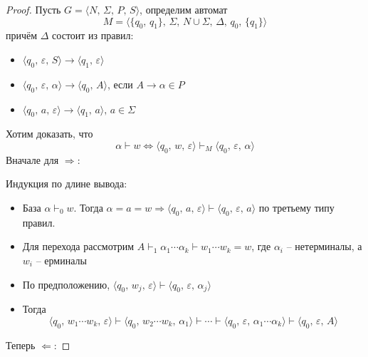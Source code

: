 \documentclass[a4paper,12pt]{article}
\theoremstyle{plain}
\theoremstyle{definition}
\theoremstyle{remark}
\begin{document}
\begin{proof}
	Пусть $G = \langle N,\, \Sigma,\, P,\, S\rangle$, определим автомат
	\[
		M = \langle \{q_0,\, q_1\},\, \Sigma,\, N \cup \Sigma,\, \Delta,\, q_0,\, \{q_1\}\rangle
	\]
	причём $\Delta$ состоит из правил:
	\begin{itemize}
		\item $\langle q_0,\, \varepsilon,\, S\rangle \to \langle q_1,\, \varepsilon\rangle$
		\item $\langle q_0,\, \varepsilon,\, \alpha\rangle \to\langle q_0,\, A\rangle$, если $A \to \alpha \in P$
		\item $\langle q_0,\, a,\, \varepsilon\rangle \to \langle q_1,\, a\rangle,\, a \in \Sigma$
	\end{itemize}
	Хотим доказать, что
	\[
		\alpha \vdash w \Leftrightarrow \langle q_0,\, w,\, \varepsilon\rangle \vdash_M \langle q_0,\, \varepsilon,\, \alpha\rangle
	\]
	Вначале для $\Rightarrow$:

	Индукция по длине вывода:
	\begin{itemize}
		\item База $\alpha \vdash_0 w$. Тогда $\alpha = a = w \Rightarrow \langle q_0,\, a,\, \varepsilon\rangle \vdash \langle q_0,\, \varepsilon,\, a\rangle$ по третьему типу правил.
		\item Для перехода рассмотрим $A \vdash_1 \alpha_1\cdots\alpha_k \vdash w_1\cdots w_k = w$, где $\alpha_i$ -- нетерминалы, а $w_i$ -- ерминалы
		\item По предположению, $\langle q_0,\, w_j,\, \varepsilon\rangle \vdash \langle q_0,\, \varepsilon,\, \alpha_j\rangle$
		\item Тогда
		      \[
			      \langle q_0,\, w_1\cdots w_k,\, \varepsilon\rangle \vdash \langle q_0,\, w_2\cdots w_k,\, \alpha_1\rangle\vdash\cdots\vdash\langle q_0,\, \varepsilon,\, \alpha_1\cdots\alpha_k\rangle \vdash\langle q_0,\, \varepsilon,\, A\rangle
		      \]
	\end{itemize}
	Теперь $\Leftarrow$:


\end{proof}
\end{document}
